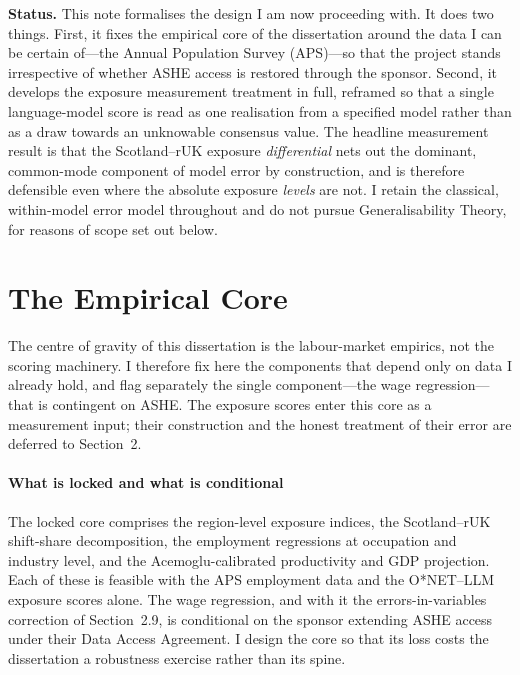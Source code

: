 \maketitle

\noindent\textbf{Status.} This note formalises the design I am now proceeding with. It does two things. First, it fixes the empirical core of the dissertation around the data I can be certain of---the Annual Population Survey (APS)---so that the project stands irrespective of whether ASHE access is restored through the sponsor. Second, it develops the exposure measurement treatment in full, reframed so that a single language-model score is read as one realisation from a specified model rather than as a draw towards an unknowable consensus value. The headline measurement result is that the Scotland--rUK exposure \emph{differential} nets out the dominant, common-mode component of model error by construction, and is therefore defensible even where the absolute exposure \emph{levels} are not. I retain the classical, within-model error model throughout and do not pursue Generalisability Theory, for reasons of scope set out below.

\section{The Empirical Core}

The centre of gravity of this dissertation is the labour-market empirics, not the scoring machinery. I therefore fix here the components that depend only on data I already hold, and flag separately the single component---the wage regression---that is contingent on ASHE. The exposure scores enter this core as a measurement input; their construction and the honest treatment of their error are deferred to Section~2.

\paragraph{What is locked and what is conditional} The locked core comprises the region-level exposure indices, the Scotland--rUK shift-share decomposition, the employment regressions at occupation and industry level, and the Acemoglu-calibrated productivity and GDP projection. Each of these is feasible with the APS employment data and the O*NET--LLM exposure scores alone. The wage regression, and with it the errors-in-variables correction of Section~2.9, is conditional on the sponsor extending ASHE access under their Data Access Agreement. I design the core so that its loss costs the dissertation a robustness exercise rather than its spine.

